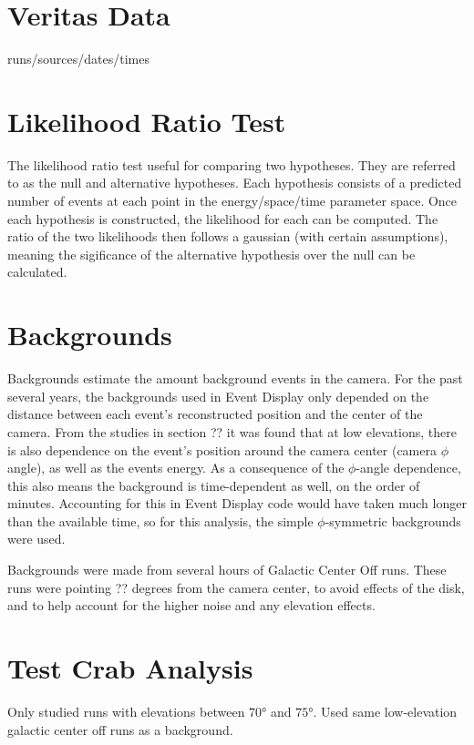 \section{Veritas Data}
runs/sources/dates/times

\section{Likelihood Ratio Test}
The likelihood ratio test useful for comparing two hypotheses.
They are referred to as the null and alternative hypotheses.
Each hypothesis consists of a predicted number of events at each point in the energy/space/time parameter space.
Once each hypothesis is constructed, the likelihood for each can be computed.
The ratio of the two likelihoods then follows a gaussian (with certain assumptions), meaning the sigificance of the alternative hypothesis over the null can be calculated.

\section{Backgrounds}

Backgrounds estimate the amount background events in the camera.
For the past several years, the backgrounds used in Event Display only depended on the distance between each event's reconstructed position and the center of the camera.
From the studies in section ?? it was found that at low elevations, there is also dependence on the event's position around the camera center (camera $\phi$ angle), as well as the events energy.
As a consequence of the $\phi$-angle dependence, this also means the background is time-dependent as well, on the order of minutes.
Accounting for this in Event Display code would have taken much longer than the available time, so for this analysis, the simple $\phi$-symmetric backgrounds were used.

Backgrounds were made from several hours of Galactic Center Off runs.
These runs were pointing ?? degrees from the camera center, to avoid effects of the disk, and to help account for the higher noise and any elevation effects.

\section{Test Crab Analysis}

Only studied runs with elevations between $\ang{70}$ and $\ang{75}$.
Used same low-elevation galactic center off runs as a background.

